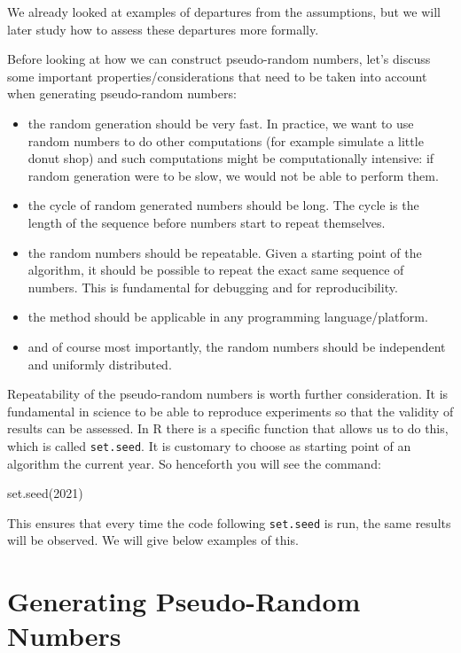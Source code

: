 \documentclass[
]{book}
\newenvironment{Shaded}{\begin{snugshade}}{\end{snugshade}}
\newcommand{\DecValTok}[1]{\textcolor[rgb]{0.00,0.00,0.81}{#1}}
\newcommand{\FunctionTok}[1]{\textcolor[rgb]{0.00,0.00,0.00}{#1}}
\newcommand{\NormalTok}[1]{#1}
\theoremstyle{definition}
\theoremstyle{definition}
\theoremstyle{definition}
\theoremstyle{definition}
\theoremstyle{remark}
\begin{document}
We already looked at examples of departures from the assumptions, but we will later study how to assess these departures more formally.

Before looking at how we can construct pseudo-random numbers, let's discuss some important properties/considerations that need to be taken into account when generating pseudo-random numbers:

\begin{itemize}
\item
  the random generation should be very fast. In practice, we want to use random numbers to do other computations (for example simulate a little donut shop) and such computations might be computationally intensive: if random generation were to be slow, we would not be able to perform them.
\item
  the cycle of random generated numbers should be long. The cycle is the length of the sequence before numbers start to repeat themselves.
\item
  the random numbers should be repeatable. Given a starting point of the algorithm, it should be possible to repeat the exact same sequence of numbers. This is fundamental for debugging and for reproducibility.
\item
  the method should be applicable in any programming language/platform.
\item
  and of course most importantly, the random numbers should be independent and uniformly distributed.
\end{itemize}

Repeatability of the pseudo-random numbers is worth further consideration. It is fundamental in science to be able to reproduce experiments so that the validity of results can be assessed. In R there is a specific function that allows us to do this, which is called \texttt{set.seed}. It is customary to choose as starting point of an algorithm the current year. So henceforth you will see the command:

\begin{Shaded}
\begin{Highlighting}[]
\FunctionTok{set.seed}\NormalTok{(}\DecValTok{2021}\NormalTok{)}
\end{Highlighting}
\end{Shaded}

This ensures that every time the code following \texttt{set.seed} is run, the same results will be observed. We will give below examples of this.

\hypertarget{generating-pseudo-random-numbers}{%
\section{Generating Pseudo-Random Numbers}\label{generating-pseudo-random-numbers}}
\end{document}
